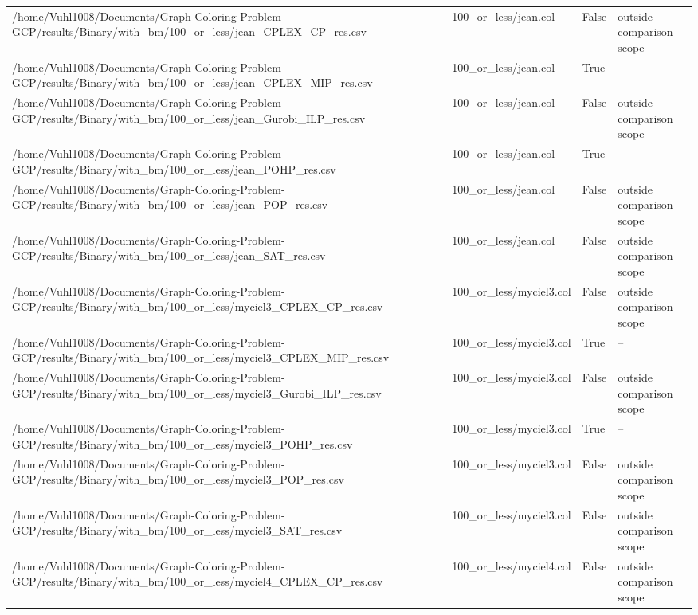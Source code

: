 \begin{table}[htbp]
\begin{tabular}{llll}
/home/Vuhl1008/Documents/Graph-Coloring-Problem-GCP/results/Binary/with\_bm/100\_or\_less/jean\_CPLEX\_CP\_res.csv & 100\_or\_less/jean.col & False & outside comparison scope \\
/home/Vuhl1008/Documents/Graph-Coloring-Problem-GCP/results/Binary/with\_bm/100\_or\_less/jean\_CPLEX\_MIP\_res.csv & 100\_or\_less/jean.col & True & -- \\
/home/Vuhl1008/Documents/Graph-Coloring-Problem-GCP/results/Binary/with\_bm/100\_or\_less/jean\_Gurobi\_ILP\_res.csv & 100\_or\_less/jean.col & False & outside comparison scope \\
/home/Vuhl1008/Documents/Graph-Coloring-Problem-GCP/results/Binary/with\_bm/100\_or\_less/jean\_POHP\_res.csv & 100\_or\_less/jean.col & True & -- \\
/home/Vuhl1008/Documents/Graph-Coloring-Problem-GCP/results/Binary/with\_bm/100\_or\_less/jean\_POP\_res.csv & 100\_or\_less/jean.col & False & outside comparison scope \\
/home/Vuhl1008/Documents/Graph-Coloring-Problem-GCP/results/Binary/with\_bm/100\_or\_less/jean\_SAT\_res.csv & 100\_or\_less/jean.col & False & outside comparison scope \\
/home/Vuhl1008/Documents/Graph-Coloring-Problem-GCP/results/Binary/with\_bm/100\_or\_less/myciel3\_CPLEX\_CP\_res.csv & 100\_or\_less/myciel3.col & False & outside comparison scope \\
/home/Vuhl1008/Documents/Graph-Coloring-Problem-GCP/results/Binary/with\_bm/100\_or\_less/myciel3\_CPLEX\_MIP\_res.csv & 100\_or\_less/myciel3.col & True & -- \\
/home/Vuhl1008/Documents/Graph-Coloring-Problem-GCP/results/Binary/with\_bm/100\_or\_less/myciel3\_Gurobi\_ILP\_res.csv & 100\_or\_less/myciel3.col & False & outside comparison scope \\
/home/Vuhl1008/Documents/Graph-Coloring-Problem-GCP/results/Binary/with\_bm/100\_or\_less/myciel3\_POHP\_res.csv & 100\_or\_less/myciel3.col & True & -- \\
/home/Vuhl1008/Documents/Graph-Coloring-Problem-GCP/results/Binary/with\_bm/100\_or\_less/myciel3\_POP\_res.csv & 100\_or\_less/myciel3.col & False & outside comparison scope \\
/home/Vuhl1008/Documents/Graph-Coloring-Problem-GCP/results/Binary/with\_bm/100\_or\_less/myciel3\_SAT\_res.csv & 100\_or\_less/myciel3.col & False & outside comparison scope \\
/home/Vuhl1008/Documents/Graph-Coloring-Problem-GCP/results/Binary/with\_bm/100\_or\_less/myciel4\_CPLEX\_CP\_res.csv & 100\_or\_less/myciel4.col & False & outside comparison scope \\

\end{tabular}
\end{table}
